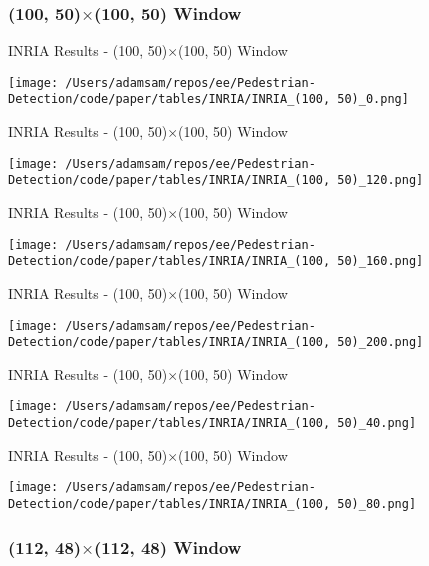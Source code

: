 
\subsubsection*{(100, 50)$\times$(100, 50) Window}

\begin{table}
    \caption{INRIA Results - (100, 50)$\times$(100, 50) Window}
    \texttt{[image: /Users/adamsam/repos/ee/Pedestrian-Detection/code/paper/tables/INRIA/INRIA\_(100, 50)\_0.png]}
    \label{tab:INRIA_(100, 50)_0}
\end{table}

\begin{table}
    \caption{INRIA Results - (100, 50)$\times$(100, 50) Window}
    \texttt{[image: /Users/adamsam/repos/ee/Pedestrian-Detection/code/paper/tables/INRIA/INRIA\_(100, 50)\_120.png]}
    \label{tab:INRIA_(100, 50)_120}
\end{table}

\begin{table}
    \caption{INRIA Results - (100, 50)$\times$(100, 50) Window}
    \texttt{[image: /Users/adamsam/repos/ee/Pedestrian-Detection/code/paper/tables/INRIA/INRIA\_(100, 50)\_160.png]}
    \label{tab:INRIA_(100, 50)_160}
\end{table}

\begin{table}
    \caption{INRIA Results - (100, 50)$\times$(100, 50) Window}
    \texttt{[image: /Users/adamsam/repos/ee/Pedestrian-Detection/code/paper/tables/INRIA/INRIA\_(100, 50)\_200.png]}
    \label{tab:INRIA_(100, 50)_200}
\end{table}

\begin{table}
    \caption{INRIA Results - (100, 50)$\times$(100, 50) Window}
    \texttt{[image: /Users/adamsam/repos/ee/Pedestrian-Detection/code/paper/tables/INRIA/INRIA\_(100, 50)\_40.png]}
    \label{tab:INRIA_(100, 50)_40}
\end{table}

\begin{table}
    \caption{INRIA Results - (100, 50)$\times$(100, 50) Window}
    \texttt{[image: /Users/adamsam/repos/ee/Pedestrian-Detection/code/paper/tables/INRIA/INRIA\_(100, 50)\_80.png]}
    \label{tab:INRIA_(100, 50)_80}
\end{table}

\subsubsection*{(112, 48)$\times$(112, 48) Window}

